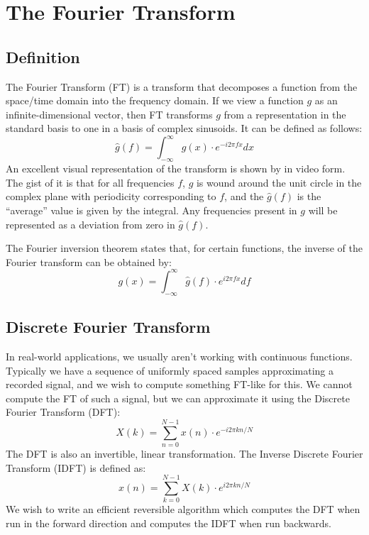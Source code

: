 \section{The Fourier Transform\label{sec:fourier}}
\subsection{Definition}
The Fourier Transform (FT) is a transform
that decomposes a function from the space/time domain into the frequency domain. %
If we view a function $g$ as an infinite-dimensional vector,
then FT transforms $g$ from a representation in the standard basis
to one in a basis of complex sinusoids.
It can be defined as follows:
%
\begin{equation}
     \hat g(f) = \int_{-\infty}^{\infty} g(x) \cdot e^{-i 2 \pi f x} dx
\end{equation}
%
An excellent visual representation of the transform is shown by \cite{3blue} in video form.
The gist of it is that for all frequencies $f$,
$g$ is wound around the unit circle in the complex plane with periodicity corresponding to $f$,
and the $\hat g(f)$ is the ``average'' value is given by the integral.
Any frequencies present in $g$ will be represented as a deviation from zero in $\hat g(f)$.
%

The Fourier inversion theorem states that,
for certain functions,
the inverse of the Fourier transform can be obtained by:
\begin{equation}
     g(x) = \int_{-\infty}^{\infty} \hat g(f) \cdot e^{i 2 \pi f x} df
\end{equation}

\subsection{Discrete Fourier Transform}
In real-world applications, we usually aren't working with continuous functions.
Typically we have a sequence of uniformly spaced samples approximating a recorded signal,
and we wish to compute something FT-like for this.
We cannot compute the FT of such a signal,
but we can approximate it using the Discrete Fourier Transform (DFT):
%
\begin{equation}
    X(k) = \sum_{n = 0}^{N - 1} x(n) \cdot e^{-i 2 \pi kn / N}
\end{equation}
%
The DFT is also an invertible, linear transformation.
The Inverse Discrete Fourier Transform (IDFT) is defined as:
\begin{equation}
    x(n) = \sum_{k = 0}^{N - 1} X(k) \cdot e^{i 2 \pi kn / N}
\end{equation}
%
We wish to write an efficient reversible algorithm
which computes the DFT when run in the forward direction
and computes the IDFT when run backwards.
